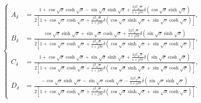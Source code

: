 \documentclass{article}
\begin{document}
\begin{equation}
    \left\{\begin{aligned}
        A_\delta &= \frac{ 1 + \cos\sqrt{\sigma } \cosh\sqrt{\sigma } - \sin\sqrt{\sigma } \sinh\sqrt{\sigma} + \frac{2 j \beta \sqrt{\sigma}}{ 1+ j \beta \sigma } \delta \left( \cos\sqrt{\sigma } \sinh\sqrt{\sigma } \right)}{2 \left[ 1 + \cos\sqrt{\sigma } \cosh\sqrt{\sigma } + \frac{j \beta \sqrt{\sigma}}{ 1+ j \beta \sigma } \delta \left( \cos\sqrt{\sigma } \sinh\sqrt{\sigma } + \sin\sqrt{\sigma } \cosh\sqrt{\sigma } \right) \right]}, \\
        B_\delta &= \frac{ \cos\sqrt{\sigma } \sinh\sqrt{\sigma } + \sin\sqrt{\sigma } \cosh\sqrt{\sigma} + \frac{2 j \beta \sqrt{\sigma}}{ 1+ j \beta \sigma } \delta \left( \sin\sqrt{\sigma } \sinh\sqrt{\sigma } \right)}{2 \left[ 1 + \cos\sqrt{\sigma } \cosh\sqrt{\sigma } + \frac{j \beta \sqrt{\sigma}}{ 1+ j \beta \sigma } \delta \left( \cos\sqrt{\sigma } \sinh\sqrt{\sigma } + \sin\sqrt{\sigma } \cosh\sqrt{\sigma } \right) \right]}, \\
        C_\delta &= \frac{ 1 + \cos\sqrt{\sigma } \cosh\sqrt{\sigma } + \sin\sqrt{\sigma } \sinh\sqrt{\sigma} + \frac{2 j \beta \sqrt{\sigma}}{ 1+ j \beta \sigma } \delta \left( \sin\sqrt{\sigma } \cosh\sqrt{\sigma } \right)}{2 \left[ 1 + \cos\sqrt{\sigma } \cosh\sqrt{\sigma } + \frac{j \beta \sqrt{\sigma}}{ 1+ j \beta \sigma } \delta \left( \cos\sqrt{\sigma } \sinh\sqrt{\sigma } + \sin\sqrt{\sigma } \cosh\sqrt{\sigma } \right) \right]}, \\
        D_\delta &= \frac{ -\cos\sqrt{\sigma } \sinh\sqrt{\sigma } - \sin\sqrt{\sigma } \cosh\sqrt{\sigma} -  \frac{2 j \beta \sqrt{\sigma}}{ 1+ j \beta \sigma } \delta \left( \sin\sqrt{\sigma } \sinh\sqrt{\sigma } \right)}{2 \left[ 1 + \cos\sqrt{\sigma } \cosh\sqrt{\sigma } + \frac{j \beta \sqrt{\sigma}}{ 1+ j \beta \sigma } \delta \left( \cos\sqrt{\sigma } \sinh\sqrt{\sigma } + \sin\sqrt{\sigma } \cosh\sqrt{\sigma } \right) \right]}.
    \end{aligned}\right.
    \label{eq:eq_disp_func_coeffs_exps}
\end{equation}
\end{document}
